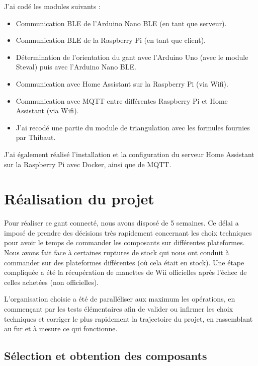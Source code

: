 \documentclass[10pt]{article}
\begin{document}
            J'ai codé les modules suivants :
            \begin{itemize}
                \item Communication BLE de l'Arduino Nano BLE (en tant que serveur).
                \item Communication BLE de la Raspberry Pi (en tant que client).
                \item Détermination de l'orientation du gant avec l'Arduino Uno (avec le module Steval) puis avec l'Arduino Nano BLE.
                \item Communication avec Home Assistant sur la Raspberry Pi (via Wifi).
                \item Communication avec MQTT entre différentes Raspberry Pi et Home Assistant (via Wifi).
                \item J'ai recodé une partie du module de triangulation avec les formules fournies par Thibaut.
            \end{itemize}

            J'ai également réalisé l'installation et la configuration du serveur Home Assistant sur la Raspberry Pi avec Docker, ainsi 
            que de MQTT.

    \section{Réalisation du projet}

            Pour réaliser ce gant connecté, nous avons disposé de 5 semaines.
            Ce délai a imposé de prendre des décisions très rapidement concernant les choix techniques
                pour avoir le temps de commander les composants sur différentes plateformes.
            Nous avons fait face à certaines ruptures de stock qui nous ont conduit à commander sur 
                des plateformes différentes (où cela était en stock).
            Une étape compliquée a été la récupération de manettes de Wii officielles après l'échec
                de celles achetées (non officielles).

            L'organisation choisie a été de paralléliser aux maximum les opérations, en commençant par les tests élémentaires
                afin de valider ou infirmer les choix techniques et corriger le plus rapidement la trajectoire du projet,
                en rassemblant au fur et à mesure ce qui fonctionne.

        \subsection{Sélection et obtention des composants}
        
\end{document}
